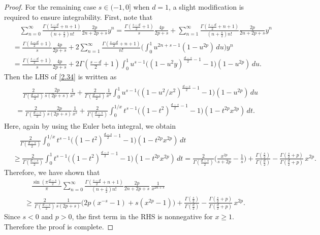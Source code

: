 \documentclass[10pt]{amsart}
\theoremstyle{plain}
\theoremstyle{remark}
\numberwithin{equation}{section}
\begin{document}
\begin{proof}
For the remaining case $s \in (-1,0]$ when $d=1$, a slight modification is required to ensure integrability. First, note that 
\begin{align*}
&\quad \sum_{n=0}^\infty \frac{  \Gamma( \frac{s-d}{2}+n+1 )  }{  (n+\frac{s}{2}) n! }   \frac{2p}{2n+2p+s} y^{n} = \frac{  \Gamma( \frac{s-d}{2}+1 )  }{  s }   \frac{4p}{2p+s}+  \sum_{n=1}^\infty \frac{  \Gamma( \frac{s-d}{2}+n+1 )  }{  (n+\frac{s}{2}) n! }   \frac{2p}{2n+2p+s} y^{n} 
\\
&= \frac{  \Gamma( \frac{s-d}{2}+1 )  }{  s }   \frac{4p}{2p+s}+  2\sum_{n=1}^\infty \frac{  \Gamma( \frac{s-d}{2}+n+1 )  }{    n! }  \bigg(\int_0^1 u^{2n+s-1}(1-u^{2p})\,du \bigg)  y^n
\\
&=\frac{  \Gamma( \frac{s-d}{2}+1 )  }{  s }   \frac{4p}{2p+s}+ 2 \Gamma( \tfrac{s-d}{2}+1 ) \int_0^1 u^{s-1} \Big( (1-u^2y)^{ \frac{d-s}{2}-1 }-1\Big) (1-u^{2p})\,du .
\end{align*} 
Then the LHS of \eqref{2.34} is written as 
\begin{align}
\begin{split}
& \quad  \frac{2}{ \Gamma( \frac{d-s}{2} ) }  \frac{2p}{s(2p+s)} \frac{1}{x^s} + \frac{2}{ \Gamma( \frac{d-s}{2} ) } \frac{1}{x^s} \int_0^1 u^{s-1} \Big( (1-u^2/x^2)^{ \frac{d-s}{2}-1 } -1 \Big) (1-u^{2p})\,du
\\
&=  \frac{2}{ \Gamma( \frac{d-s}{2} ) }  \frac{2p}{s(2p+s)} \frac{1}{x^s} +  \frac{2}{ \Gamma( \frac{d-s}{2} ) }   \int_0^{1/x} t^{s-1} \Big( (1-t^2)^{ \frac{d-s}{2}-1 }-1\Big) (1-t^{2p}x^{2p})\,dt. 
\end{split}  
\end{align}
Here, again by using the Euler beta integral, we obtain  
\begin{align*}
&\quad \frac{2}{ \Gamma( \frac{d-s}{2} ) }   \int_0^{1/x} t^{s-1} \Big( (1-t^2)^{ \frac{d-s}{2}-1 }-1\Big) (1-t^{2p}x^{2p})\,dt 
\\
&\ge \frac{2}{ \Gamma( \frac{d-s}{2} ) }   \int_0^{1} t^{s-1} \Big( (1-t^2)^{ \frac{d-s}{2}-1 }-1\Big) (1-t^{2p}x^{2p})\,dt 
= \frac{2}{ \Gamma( \frac{d-s}{2} ) }\Big( \frac{x^{2p}}{s+2p} -\frac{1}{s}\Big)   + \frac{ \Gamma(\frac{s}{2})   }{ \Gamma(\frac{d}{2})  }   -    \frac{ \Gamma(\frac{s}{2}+p)   }{ \Gamma(\frac{d}{2}+p)  } \,      x^{2p}.
\end{align*}
Therefore, we have shown that 
\begin{align*}
&\quad  \frac{\sin(\pi\tfrac{d-s}{2})}{\pi} \sum_{n=0}^\infty \frac{  \Gamma( \frac{s-d}{2}+n+1 )  }{  (n+\frac{s}{2}) n! }   \frac{2p}{2n+2p+s}    \, \frac{1}{x^{2n+s}}
\\
& \ge \frac{2}{ \Gamma( \frac{d-s}{2} ) } \frac{1}{s(2p+s)} \Big( 2p(x^{-s}-1)+s (x^{2p}-1) \Big)  + \frac{ \Gamma(\frac{s}{2})   }{ \Gamma(\frac{d}{2})  }   -    \frac{ \Gamma(\frac{s}{2}+p)   }{ \Gamma(\frac{d}{2}+p)  } \,      x^{2p}.
\end{align*}
Since $s<0$ and $p>0$, the first term in the RHS is nonnegative for $x \ge 1$. Therefore the proof is complete. 
\end{proof}
\end{document}
